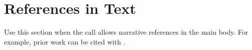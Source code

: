 \section{References in Text}

Use this section when the call allows narrative references in the main
body. For example, prior work can be cited with
\citep{template2024grant,template2023methods,demo2025workflow}.
